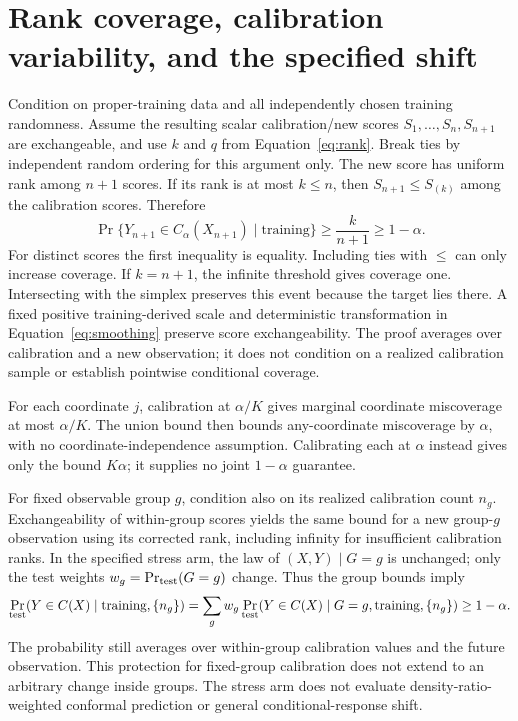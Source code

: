 \section{Rank coverage, calibration variability, and the specified shift}
\label{app:rank}
Condition on proper-training data and all independently chosen training randomness. Assume the resulting scalar calibration/new scores $S_1,\ldots,S_n,S_{n+1}$ are exchangeable, and use $k$ and $q$ from Equation~\eqref{eq:rank}. Break ties by independent random ordering for this argument only. The new score has uniform rank among $n+1$ scores. If its rank is at most $k\leq n$, then $S_{n+1}\leq S_{(k)}$ among the calibration scores. Therefore
\begin{equation}
 \Pr\{Y_{n+1}\in C_\alpha(X_{n+1})\mid\text{training}\}
 \geq \frac{k}{n+1}\geq1-\alpha.
 \label{eq:rank-proof}
\end{equation}
For distinct scores the first inequality is equality. Including ties with $\leq$ can only increase coverage. If $k=n+1$, the infinite threshold gives coverage one. Intersecting with the simplex preserves this event because the target lies there. A fixed positive training-derived scale and deterministic transformation in Equation~\eqref{eq:smoothing} preserve score exchangeability. The proof averages over calibration and a new observation; it does not condition on a realized calibration sample or establish pointwise conditional coverage.

For each coordinate $j$, calibration at $\alpha/K$ gives marginal coordinate miscoverage at most $\alpha/K$. The union bound then bounds any-coordinate miscoverage by $\alpha$, with no coordinate-independence assumption. Calibrating each at $\alpha$ instead gives only the bound $K\alpha$; it supplies no joint $1-\alpha$ guarantee.

For fixed observable group $g$, condition also on its realized calibration count $n_g$. Exchangeability of within-group scores yields the same bound for a new group-$g$ observation using its corrected rank, including infinity for insufficient calibration ranks. In the specified stress arm, the law of $(X,Y)\mid G=g$ is unchanged; only the test weights $w_g=\Pr_{\rm test}(G=g)$ change. Thus the group bounds imply
\begin{equation}
 \Pr_{\rm test}(Y\in C(X)\mid\text{training},\{n_g\})
 =\sum_g w_g\Pr_{\rm test}(Y\in C(X)\mid G=g,\text{training},\{n_g\})
 \geq 1-\alpha.
 \label{eq:shift-proof}
\end{equation}
The probability still averages over within-group calibration values and the future observation. This protection for fixed-group calibration does not extend to an arbitrary change inside groups. The stress arm does not evaluate density-ratio-weighted conformal prediction or general conditional-response shift.

